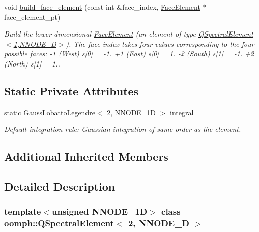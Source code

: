 \begin{DoxyCompactItemize}
void \hyperlink{classoomph_1_1QSpectralElement_3_012_00_01NNODE__1D_01_4_abae3864ec434104f3283b24a50a524c0}{build\+\_\+face\+\_\+element} (const int \&face\+\_\+index, \hyperlink{classoomph_1_1FaceElement}{Face\+Element} $\ast$face\+\_\+element\+\_\+pt)
\begin{DoxyCompactList}\small\item\em Build the lower-\/dimensional \hyperlink{classoomph_1_1FaceElement}{Face\+Element} (an element of type \hyperlink{classoomph_1_1QSpectralElement_3_011_00_01NNODE__1D_01_4}{Q\+Spectral\+Element$<$1,\+N\+N\+O\+D\+E\+\_\+D$>$}). The face index takes four values corresponding to the four possible faces\+: -\/1 (West) s\mbox{[}0\mbox{]} = -\/1. +1 (East) s\mbox{[}0\mbox{]} = 1. -\/2 (South) s\mbox{[}1\mbox{]} = -\/1. +2 (North) s\mbox{[}1\mbox{]} = 1.. \end{DoxyCompactList}\end{DoxyCompactItemize}
\subsection*{Static Private Attributes}
\begin{DoxyCompactItemize}
\item 
static \hyperlink{classoomph_1_1GaussLobattoLegendre}{Gauss\+Lobatto\+Legendre}$<$ 2, N\+N\+O\+D\+E\+\_\+1D $>$ \hyperlink{classoomph_1_1QSpectralElement_3_012_00_01NNODE__1D_01_4_af32777de68d22e844aeb5c0d93cbcda8}{integral}
\begin{DoxyCompactList}\small\item\em Default integration rule\+: Gaussian integration of same \textquotesingle{}order\textquotesingle{} as the element. \end{DoxyCompactList}\end{DoxyCompactItemize}
\subsection*{Additional Inherited Members}


\subsection{Detailed Description}
\subsubsection*{template$<$unsigned N\+N\+O\+D\+E\+\_\+1D$>$\newline
class oomph\+::\+Q\+Spectral\+Element$<$ 2, N\+N\+O\+D\+E\+\_\+D $>$}

